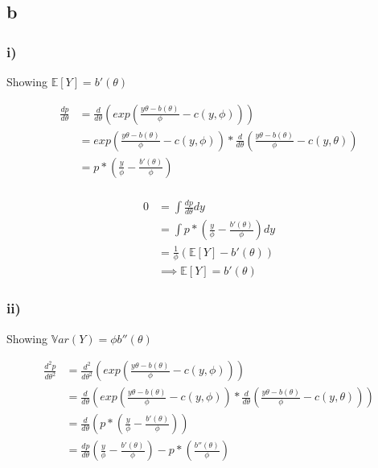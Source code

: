 \documentclass[]{article}
\begin{document}
\hypertarget{b}{%
\subsection{b}\label{b}}

\hypertarget{i-1}{%
\subsubsection{i)}\label{i-1}}

Showing \(\mathbb{E}[Y] = b'(\theta)\)

\[
\begin{aligned}
\frac{dp}{d\theta} &= \frac{d}{d\theta} \left( exp \left( \frac{y \theta - b(\theta)}{\phi} - c(y, \phi) \right) \right) \\
&= exp \left( \frac{y \theta - b(\theta)}{\phi} - c(y, \phi) \right) * \frac{d}{d\theta} \left( \frac{y \theta - b(\theta)}{\phi} - c(y, \theta) \right) \\
&= p * \left( \frac{y}{\phi} - \frac{b'(\theta)}{\phi} \right) \\
\end{aligned}
\]

\[
\begin{aligned}
0 &= \int \frac{dp}{d\theta} dy \\
&= \int p * \left( \frac{y}{\phi} - \frac{b'(\theta)}{\phi} \right) dy \\
&= \frac{1}{\phi} (\mathbb{E}[Y] - b'(\theta)) \\
&\implies \mathbb{E}[Y] = b'(\theta)
\end{aligned}
\]

\hypertarget{ii-1}{%
\subsubsection{ii)}\label{ii-1}}

Showing \(\mathbb{V}ar(Y) = \phi b''(\theta)\)

\[
\begin{aligned}
\frac{d^2p}{d\theta^2} &= \frac{d^2}{d\theta^2} \left( exp \left( \frac{y \theta - b(\theta)}{\phi} - c(y, \phi) \right) \right) \\
&= \frac{d}{d\theta}\left( exp \left( \frac{y \theta - b(\theta)}{\phi} - c(y, \phi) \right) * \frac{d}{d\theta} \left( \frac{y \theta - b(\theta)}{\phi} - c(y, \theta) \right) \right) \\
&= \frac{d}{d\theta}\left(p * \left( \frac{y}{\phi} - \frac{b'(\theta)}{\phi} \right) \right) \\
&= \frac{dp}{d\theta} \left( \frac{y}{\phi} - \frac{b'(\theta)}{\phi} \right) - p * \left(  \frac{b''(\theta)}{\phi} \right)
\end{aligned}
\]
\end{document}
